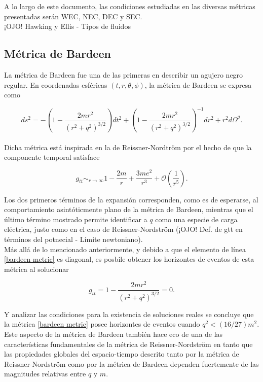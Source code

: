 \documentclass[prb,aps,preprintnumbers,amsmath,amssymb]{article}
\numberwithin{equation}{section}
\begin{document}
A lo largo de este documento, las condiciones estudiadas en las diversas métricas presentadas serán WEC, NEC, DEC y SEC.\\

¡OJO! Hawking y Ellis - Tipos de fluidos

\subsection{Métrica de Bardeen}

La métrica de Bardeen \cite{bardeen,borde-1994,borde-1996} fue una de las primeras en describir un agujero negro regular. En coordenadas esféricas $(t,r,\theta,\phi)$, la métrica de Bardeen se expresa como

\begin{equation}
\label{bardeen metric}
ds^2 = -\left( 1 - \frac{2mr^2}{(r^2 + q^2)^{3/2}} \right)dt^2 + \left( 1 - \frac{2mr^2}{(r^2 + q^2)^{3/2}} \right)^{-1}dr^2 + r^2d\Omega^2.
\end{equation}\\

Dicha métrica está inspirada en la de Reissner-Nordtröm por el hecho de que la componente temporal satisface

\begin{equation}
g_{tt} \sim_{r \to \infty} 1 - \frac{2m}{r} + \frac{3me^2}{r^3} + \mathcal{O}\left( \frac{1}{r^5} \right).
\end{equation}

Los dos primeros términos de la expansión corresponden, como es de esperarse, al comportamiento asintóticmente plano de la métrica de Bardeen, mientras que el último término mostrado permite identificar a $q$ como una especie de carga eléctrica, justo como en el caso de Reissner-Nordström (¡OJO! Def. de gtt en términos del potnecial - Límite newtoniano).\\

Más allá de lo mencionado anteriormente, y debido a que el elemento de línea \eqref{bardeen metric} es diagonal, es posbile obtener los horizontes de eventos de esta métrica al solucionar

\begin{equation}
g_{tt} = 1 - \frac{2mr^2}{(r^2 + q^2)^{3/2}} = 0.
\end{equation}

Y analizar las condiciones para la existencia de soluciones reales se concluye que la métrica \eqref{bardeen metric} posee horizontes de eventos cuando $q^2 < (16/27)m^2$. Este aspecto de la métrica de Bardeen también hace eco de una de las características fundamentales de la métrica de Reissner-Nordström en tanto que las propiedades globales del espacio-tiempo descrito tanto por la métrica de Reissner-Nordström como por la métrica de Bardeen dependen fuertemente de las magnitudes relativas entre $q$ y $m$.\\
\end{document}
